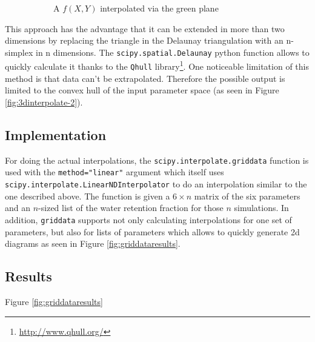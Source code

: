 \begin{figure}[]
\begin{subfigure}[t]{0.48\textwidth}
		\caption{A $f(X,Y)$ interpolated via the green plane}
		\label{fig:3dinterpolate-3}
	\end{subfigure}
	\caption{}

\end{figure}



This approach has the advantage that it can be extended in more than two dimensions by replacing the triangle in the Delaunay triangulation with an n-simplex in n dimensions. The \texttt{scipy.spatial.Delaunay} python function allows to quickly calculate it thanks to the \texttt{Qhull} library\footnote{\url{http://www.qhull.org/}}. One noticeable limitation of this method is that data can't be extrapolated. Therefore the possible output is limited to the convex hull of the input parameter space (as seen in Figure \ref{fig:3dinterpolate-2}).

\subsection{Implementation}
\label{sec:griddata-implementation}
For doing the actual interpolations, the \texttt{scipy.interpolate.griddata} function is used with the \texttt{method="linear"} argument which itself uses \texttt{scipy.interpolate.LinearNDInterpolator} to do an interpolation similar to the one described above. The function is given a $6\times n$ matrix of the six parameters and an $n$-sized list of the water retention fraction for those $n$ simulations. In addition, \texttt{griddata} supports not only calculating interpolations for one set of parameters, but also for lists of parameters which allows to quickly generate 2d diagrams as seen in  Figure \ref{fig:griddataresults}.

\subsection{Results}

Figure \ref{fig:griddataresults}

